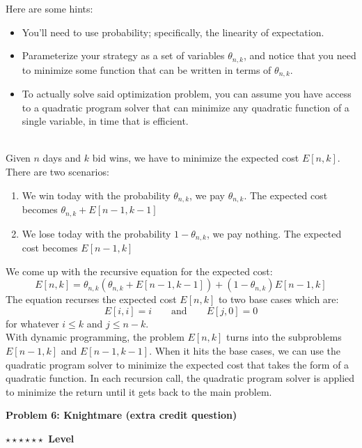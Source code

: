 \documentclass{article}\usepackage[utf8]{inputenc}\usepackage[margin=0.4cm,top=0.4cm,bottom=0.4cm]{geometry}
\begin{document}
\vspace{4pt}
\noindent Here are some hints:
\begin{itemize}
\item You'll need to use probability; specifically, the linearity of expectation.
\item Parameterize your strategy as a set of variables $\theta_{n, k}$, and notice that you need to minimize some function that can be written in terms of $\theta_{n, k}$.
\item To actually solve said optimization problem, you can assume you have access to a quadratic program solver that can minimize any quadratic function of a single variable, in time that is efficient.
\end{itemize}
\BeginSolution %
\\
Given $n$ days and $k$ bid wins, we have to minimize the expected cost $E[n,k]$. There are two scenarios:
%
\begin{enumerate}[1.]
	\item We win today with the probability $\theta_{n,k}$, we pay $\theta_{n,k}$. The expected cost becomes $\theta_{n,k} + E[n-1,k-1]$
	\item We lose today with the probability $1 - \theta_{n,k}$, we pay nothing. The expected cost becomes $E[n-1,k]$
\end{enumerate}
%
We come up with the recursive equation for the expected cost:
%
\begin{equation}
E[n,k] = \theta_{n,k}\left(\theta_{n,k} + E[n-1,k-1]\right) + \left(1 - \theta_{n,k}\right)E[n-1,k]
\end{equation}
%
The equation recurses the expected cost $E[n,k]$ to two base cases which are:
%
\begin{equation}
E[i,i] = i \qquad \text{and} \qquad E[j,0] = 0
\end{equation}
%
for whatever $i\leq k$ and $j\leq n-k$.\\
With dynamic programming, the problem $E[n,k]$ turns into the subproblems $E[n-1,k]$ and $E[n-1,k-1]$. When it hits the base cases, we can use the quadratic program solver to minimize the expected cost that takes the form of a quadratic function. In each recursion call, the quadratic program solver is applied to minimize the return until it gets back to the main problem. 
\EndSolution
\clearpage

\vspace{-2mm}\noindent\begin{mybox}{\begin{center}\textbf{\color{black}Problem 6: Knightmare (extra credit question)}\end{center}}\end{mybox}\vspace{-2mm}
\begin{myboxot}\noindent\textbf{$\star\star\star\star\star\star$ Level}\end{myboxot} 
\end{document}

